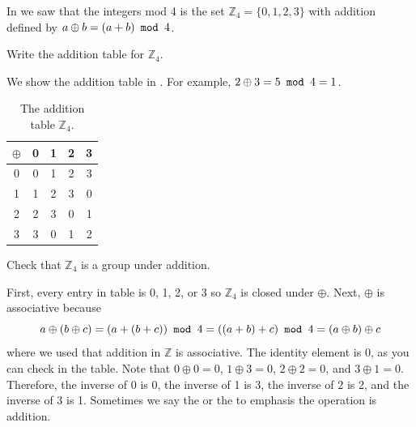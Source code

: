 \begin{exam}
\label{exam_intmod4_add_group}
    In  we saw that the integers mod 4 is the set $\mathbb{Z}_4 =\{0,1,2,3\}$ with addition defined by $a \oplus b = (a+b) \texttt{ mod } 4$.
        \begin{apart}
            \item Write the addition table for $\mathbb{Z}_4$.
                \begin{soln}
                    We show the addition table in .  For example, $2 \oplus 3 = 5 \texttt{ mod } 4 = 1$.
                        \begin{table}[hbtp]
                            \centering
                            \begin{tabular}{c|cccc} 
                                 $\oplus$ & 0 & 1 & 2 & 3 \\ \hline
                                 0 & 0 & 1 & 2 & 3 \\
                                 1 & 1 & 2 & 3 & 0 \\
                                 2 & 2 & 3 & 0 & 1 \\
                                 3 & 3 & 0 & 1 & 2 
                            \end{tabular}
                            \caption{The addition table  $\mathbb{Z}_4$.}
                            \label{tab_add_mod4}
                        \end{table}
                \end{soln}
            \item Check that $\mathbb{Z}_4$ is a group under addition.
                \begin{soln}
                    First, every entry in table is 0, 1, 2, or 3 so $\mathbb{Z}_4$ is closed under $\oplus$.  Next, $\oplus$ is associative because $$a \oplus (b \oplus c) = (a+(b+c)) \texttt{ mod } 4 =  ((a+b)+c) \texttt{ mod } 4 = (a \oplus b) \oplus c$$ where we used that addition in $\mathbb{Z}$ is associative.  The identity element is 0, as you can check in the table.  Note that $0\oplus0 = 0$, $1 \oplus 3 = 0$, $2 \oplus 2 = 0$, and $3 \oplus 1 = 0$.  Therefore, the inverse of 0 is 0, the inverse of 1 is 3, the inverse of 2 is 2, and the inverse of 3 is 1.  Sometimes we say the  or the  to emphasis the operation is addition.
                \end{soln}
        \end{apart}
\end{exam}

